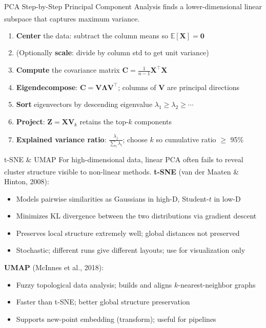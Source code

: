 \begin{v3topic}{PCA Step-by-Step}
    Principal Component Analysis finds a lower-dimensional linear subspace that captures maximum variance\textsuperscript{\cite{hastieElementsStatisticalLearning2008}}.
\visualseparator
    \begin{enumerate}
        \item \textbf{Center} the data: subtract the column means so $\mathbb{E}[\mathbf{X}] = \mathbf{0}$
        \item (Optionally \textbf{scale}: divide by column std to get unit variance)
        \item \textbf{Compute} the covariance matrix $\mathbf{C} = \frac{1}{n-1}\mathbf{X}^\top\mathbf{X}$
        \item \textbf{Eigendecompose}: $\mathbf{C} =
              \mathbf{V}\boldsymbol{\Lambda}\mathbf{V}^\top$; columns of
              $\mathbf{V}$ are principal directions
        \item \textbf{Sort} eigenvectors by descending eigenvalue $\lambda_1 \geq \lambda_2 \geq \cdots$
        \item \textbf{Project}: $\mathbf{Z} = \mathbf{X}\mathbf{V}_k$ retains the top-$k$ components
        \item \textbf{Explained variance ratio}: $\frac{\lambda_j}{\sum_i \lambda_i}$; choose $k$ so cumulative ratio $\geq$ 95\%
    \end{enumerate}

\end{v3topic}
\begin{v3topic}{t-SNE \& UMAP}
    For high-dimensional data, linear PCA often fails to reveal cluster structure visible to non-linear methods\textsuperscript{\cite{hastieElementsStatisticalLearning2008}}.
\visualseparator
    \textbf{t-SNE} (van der Maaten \& Hinton, 2008):
    \begin{itemize}
        \item Models pairwise similarities as Gaussians in high-D, Student-$t$ in low-D
        \item Minimizes KL divergence between the two distributions via gradient descent
        \item Preserves local structure extremely well; global distances not preserved
        \item Stochastic; different runs give different layouts; use for visualization only
    \end{itemize}
    \textbf{UMAP} (McInnes et al., 2018):
    \begin{itemize}
        \item Fuzzy topological data analysis; builds and aligns $k$-nearest-neighbor graphs
        \item Faster than t-SNE; better global structure preservation
        \item Supports new-point embedding (transform); useful for pipelines
    \end{itemize}
\end{v3topic}


